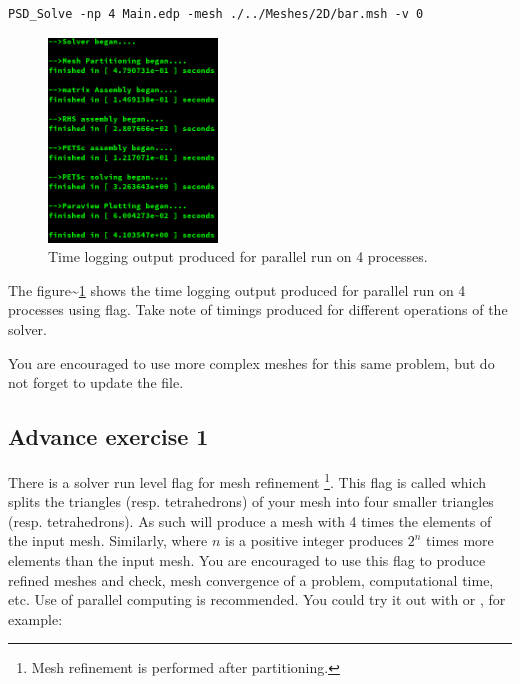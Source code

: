 \begin{lstlisting}[style=BashInputStyle]
PSD_Solve -np 4 Main.edp -mesh ./../Meshes/2D/bar.msh -v 0
\end{lstlisting}

\begin{figure}[h!]
\centering
\includegraphics[width=0.4\textwidth]{./Images/le-time-par.png}
\caption{Time logging output produced for parallel run on 4 processes.\label{time-par-le}}
\end{figure}

The figure\textasciitilde{}\ref{time-par-le} shows the time logging
output produced for parallel run on 4 processes using 
flag. Take note of timings produced for different operations of the
solver.

You are encouraged to use more complex meshes for this same problem, but
do not forget to update the  file.

\subsection{Advance exercise  1}

There is a solver run level flag for mesh refinement
\footnote{Mesh refinement is performed after partitioning.}. This flag
is called  which splits the triangles (resp.
tetrahedrons) of your mesh into four smaller triangles (resp.
tetrahedrons). As such  will produce a mesh with 4 times
the elements of the input mesh. Similarly,  where \(n\) is
a positive integer produces \(2^n\) times more elements than the input
mesh. You are encouraged to use this  flag to produce
refined meshes and check, mesh convergence of a problem, computational
time, etc. Use of parallel computing is recommended. You could try it
out with  or , for example:

